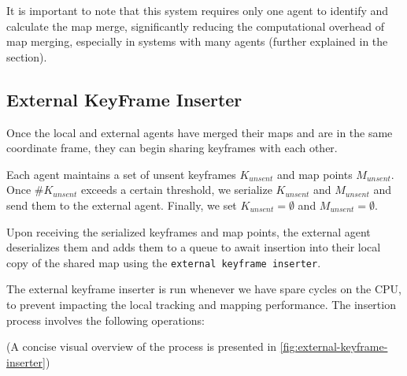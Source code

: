 It is important to note that this system requires only one agent to identify and calculate the map merge, significantly reducing the computational overhead of map merging, especially in systems with many agents (further explained in the  section).


\subsection{External KeyFrame Inserter}
\label{sec:external-key-frame-inserter}
Once the local and external agents have merged their maps and are in the same coordinate frame, they can begin sharing keyframes with each other.

Each agent maintains a set of unsent keyframes $K_{unsent}$ and map points $M_{unsent}$. Once $\#K_{unsent}$ exceeds a certain threshold, we serialize $K_{unsent}$ and $M_{unsent}$ and send them to the external agent. Finally, we set $K_{unsent} = \emptyset$ and $M_{unsent} = \emptyset$.

Upon receiving the serialized keyframes and map points, the external agent deserializes them and adds them to a queue to await insertion into their local copy of the shared map using the \texttt{external keyframe inserter}.

The external keyframe inserter is run whenever we have spare cycles on the CPU, to prevent impacting the local tracking and mapping performance. The insertion process involves the following operations:

(A concise visual overview of the process is presented in \autoref{fig:external-keyframe-inserter})

